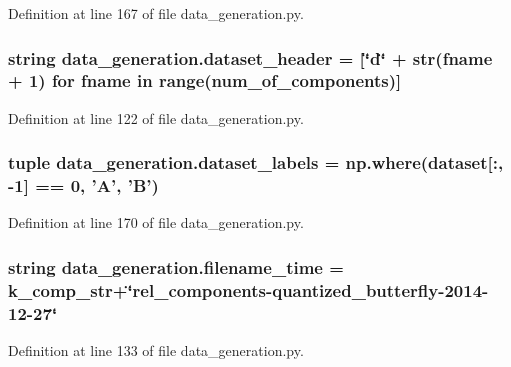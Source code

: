 Definition at line 167 of file data\+\_\+generation.\+py.

\hypertarget{namespacedata__generation_a345ef2cc135025dccbfbba8502ba6d8d}{
\subsubsection[{dataset\+\_\+header}]{\setlength{\rightskip}{0pt plus 5cm}string data\+\_\+generation.\+dataset\+\_\+header = \mbox{[}\char`\"{}d\char`\"{} + str(fname + 1) for fname in range({\bf num\+\_\+of\+\_\+components})\mbox{]}}}\label{namespacedata__generation_a345ef2cc135025dccbfbba8502ba6d8d}


Definition at line 122 of file data\+\_\+generation.\+py.

\hypertarget{namespacedata__generation_ad88beaf5c221ab8fbfeac2fd7aaafe65}{
\subsubsection[{dataset\+\_\+labels}]{\setlength{\rightskip}{0pt plus 5cm}tuple data\+\_\+generation.\+dataset\+\_\+labels = np.\+where({\bf dataset}\mbox{[}\+:, -\/1\mbox{]} == 0, 'A', 'B')}}\label{namespacedata__generation_ad88beaf5c221ab8fbfeac2fd7aaafe65}


Definition at line 170 of file data\+\_\+generation.\+py.

\hypertarget{namespacedata__generation_ad5e85da3fcf335e51b7dacc9404e221b}{
\subsubsection[{filename\+\_\+time}]{\setlength{\rightskip}{0pt plus 5cm}string data\+\_\+generation.\+filename\+\_\+time = {\bf k\+\_\+comp\+\_\+str}+\char`\"{}rel\+\_\+components-\/quantized\+\_\+butterfly-\/2014-\/12-\/27\char`\"{}}}\label{namespacedata__generation_ad5e85da3fcf335e51b7dacc9404e221b}


Definition at line 133 of file data\+\_\+generation.\+py.

